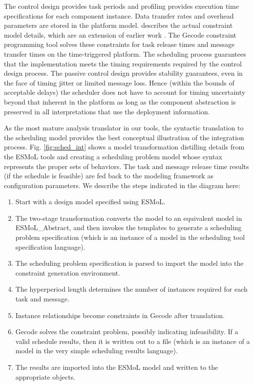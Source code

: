 The control design provides task periods and profiling provides execution time specifications for
each component instance.  Data transfer rates and overhead parameters are stored
in the platform model. \cite{sched:analysis}
describes the actual constraint model details, which are an extension of earlier
work \cite{sched:offline}. The Gecode constraint programming
tool \cite{tools:gecode} solves these constraints for task release times and
message transfer times on the time-triggered platform. The scheduling process
guarantees that the implementation meets the timing requirements required by the
control design process.  The passive control design provides stability
guarantees, even in the face of timing jitter or limited message loss.  Hence
(within the bounds of acceptable delays) the scheduler does not have to account
for timing uncertainty beyond that inherent in the platform as long as the
component abstraction is preserved in all interpretations that use the
deployment information.

As the most mature analysis translator in our tools, the syntactic translation to the scheduling model 
provides the best conceptual illustration of the integration process.  Fig. \ref{fig:sched_int} shows a 
model transformation distilling details from the ESMoL tools and creating a scheduling problem model whose 
syntax represents the proper sets of behaviors.  The task and message release time results (if the schedule 
is feasible) are fed back to the modeling framework as configuration parameters.  We describe the steps
indicated in the diagram here:

\begin{enumerate}
 \item Start with a design model specified using ESMoL.
 \item The two-stage transformation converts the model to an equivalent model in ESMoL\_Abstract, and
then invokes the templates to generate a scheduling problem specification (which is an instance of a 
model in the scheduling tool specification language).
 \item The scheduling problem specification is parsed to import the model into the constraint generation
environment.
 \item The hyperperiod length determines the number of instances required for each task and message.
 \item Instance relationships become constraints in Gecode after translation.
 \item Gecode solves the constraint problem, possibly indicating infeasibility.  If a valid schedule results, 
then it is written out to a file (which is an instance of a model in the very simple scheduling results language).
 \item The results are imported into the ESMoL model and written to the appropriate objects.
\end{enumerate}



